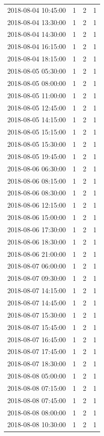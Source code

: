 \begin{tabular}{lrrr}
2018-08-04 10:45:00 & 1 & 2 & 1 \\
2018-08-04 13:30:00 & 1 & 2 & 1 \\
2018-08-04 14:30:00 & 1 & 2 & 1 \\
2018-08-04 16:15:00 & 1 & 2 & 1 \\
2018-08-04 18:15:00 & 1 & 2 & 1 \\
2018-08-05 05:30:00 & 1 & 2 & 1 \\
2018-08-05 08:00:00 & 1 & 2 & 1 \\
2018-08-05 11:00:00 & 1 & 2 & 1 \\
2018-08-05 12:45:00 & 1 & 2 & 1 \\
2018-08-05 14:15:00 & 1 & 2 & 1 \\
2018-08-05 15:15:00 & 1 & 2 & 1 \\
2018-08-05 15:30:00 & 1 & 2 & 1 \\
2018-08-05 19:45:00 & 1 & 2 & 1 \\
2018-08-06 06:30:00 & 1 & 2 & 1 \\
2018-08-06 08:15:00 & 1 & 2 & 1 \\
2018-08-06 08:30:00 & 1 & 2 & 1 \\
2018-08-06 12:15:00 & 1 & 2 & 1 \\
2018-08-06 15:00:00 & 1 & 2 & 1 \\
2018-08-06 17:30:00 & 1 & 2 & 1 \\
2018-08-06 18:30:00 & 1 & 2 & 1 \\
2018-08-06 21:00:00 & 1 & 2 & 1 \\
2018-08-07 06:00:00 & 1 & 2 & 1 \\
2018-08-07 09:30:00 & 1 & 2 & 1 \\
2018-08-07 14:15:00 & 1 & 2 & 1 \\
2018-08-07 14:45:00 & 1 & 2 & 1 \\
2018-08-07 15:30:00 & 1 & 2 & 1 \\
2018-08-07 15:45:00 & 1 & 2 & 1 \\
2018-08-07 16:45:00 & 1 & 2 & 1 \\
2018-08-07 17:45:00 & 1 & 2 & 1 \\
2018-08-07 18:30:00 & 1 & 2 & 1 \\
2018-08-08 05:00:00 & 1 & 2 & 1 \\
2018-08-08 07:15:00 & 1 & 2 & 1 \\
2018-08-08 07:45:00 & 1 & 2 & 1 \\
2018-08-08 08:00:00 & 1 & 2 & 1 \\
2018-08-08 10:30:00 & 1 & 2 & 1 \\

\end{tabular}
